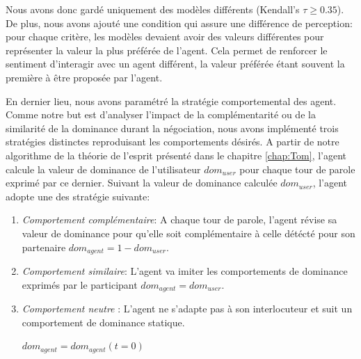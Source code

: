 Nous avons donc gardé uniquement des modèles différents (Kendall's  $ \tau \geq 0.35$). De plus, nous avons ajouté une condition qui assure une différence de perception: pour chaque critère, les modèles devaient avoir des valeurs différentes pour représenter la valeur la plus préférée de l'agent. 
Cela permet de renforcer le sentiment d'interagir avec un agent différent, la valeur préférée étant souvent la première à être proposée par l'agent. 

En dernier lieu, nous avons paramétré la stratégie comportemental des agent. Comme notre but est d'analyser l'impact de la complémentarité ou de la similarité de la dominance durant la négociation, nous avons implémenté trois stratégies distinctes reproduisant les comportements désirés. 
A partir de notre algorithme de la théorie de l'esprit présenté dans le chapitre \ref{chap:Tom}, l'agent calcule la valeur de dominance de l'utilisateur $dom_{user}$ pour chaque tour de parole exprimé par ce dernier. Suivant la valeur de dominance calculée $dom_{user}$, l'agent adopte une des stratégie suivante:



\begin{enumerate}
	\item \textit{Comportement complémentaire}: A chaque tour de parole, l'agent révise sa valeur de dominance pour qu'elle soit complémentaire à celle détécté pour son partenaire $dom_{agent}=1-dom_{user}$.
	
	\item \textit{Comportement similaire}: L'agent va imiter les comportements de dominance exprimés par le participant $dom_{agent} = dom_{user}$.
	
	\item \textit{Comportement neutre} : L'agent ne s'adapte pas à son interlocuteur et suit un comportement de dominance statique.
	
	 $dom_{agent} = dom_{agent} (t=0)$
\end{enumerate}

